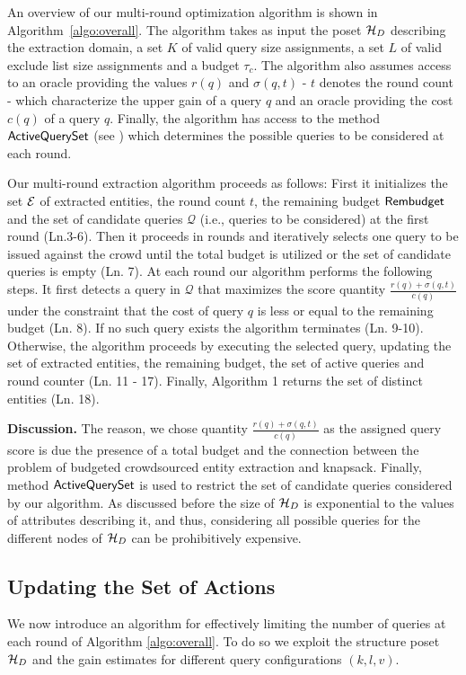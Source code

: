 An overview of our multi-round optimization algorithm is shown in Algorithm~\ref{algo:overall}. The algorithm takes as input the poset $\mathcal{H}_D$ describing the extraction domain, a set $K$ of valid query size assignments, a set $L$ of valid exclude list size assignments and a budget $\tau_c$. The algorithm also assumes access to an oracle providing the values $r(q)$ and $\sigma(q,t)$ - $t$ denotes the round count -  which characterize the upper gain of a query $q$ and an oracle providing the cost $c(q)$ of a query $q$. Finally, the algorithm has access to the method ${\sf ActiveQuerySet}$ (see ) which determines the possible queries to be considered at each round.

Our multi-round extraction algorithm proceeds as follows: First it initializes the set $\mathcal{E}$ of extracted entities, the round count $t$, the remaining budget ${\sf Rembudget}$ and the set of candidate queries $\mathcal{Q}$ (i.e., queries to be considered) at the first round (Ln.3-6). Then it proceeds in rounds and iteratively selects one query to be issued against the crowd until the total budget is utilized or the set of candidate queries is empty (Ln. 7). At each round our algorithm performs the following steps. It first detects a query in $\mathcal{Q}$ that maximizes the score quantity $\frac{r(q) + \sigma(q,t)}{c(q)}$ under the constraint that the cost of query $q$ is less or equal to the remaining budget (Ln. 8). If no such query exists the algorithm terminates (Ln. 9-10). Otherwise, the algorithm proceeds by executing the selected query, updating the set of extracted entities, the remaining budget, the set of active queries and round counter (Ln. 11 - 17). Finally, Algorithm 1 returns the set of distinct entities (Ln. 18). 

\vspace{2pt}\noindent\textbf{Discussion.} The reason, we chose quantity $\frac{r(q) + \sigma(q,t)}{c(q)}$ as the assigned query score is due the presence of a total budget and the connection between the problem of budgeted crowdsourced entity extraction and knapsack. Finally, method ${\sf ActiveQuerySet}$ is used to restrict the set of candidate queries considered by our algorithm. As discussed before the size of $\mathcal{H}_D$ is exponential to the values of attributes describing it, and thus, considering all possible queries for the different nodes of $\mathcal{H}_D$ can be prohibitively expensive. 

\subsection{Updating the Set of Actions}
\label{sec:badactions}
We now introduce an algorithm for effectively limiting the number of queries at each round of Algorithm \ref{algo:overall}. To do so we exploit the structure poset $\mathcal{H}_D$ and the gain estimates for different query configurations $(k,l,v)$.

